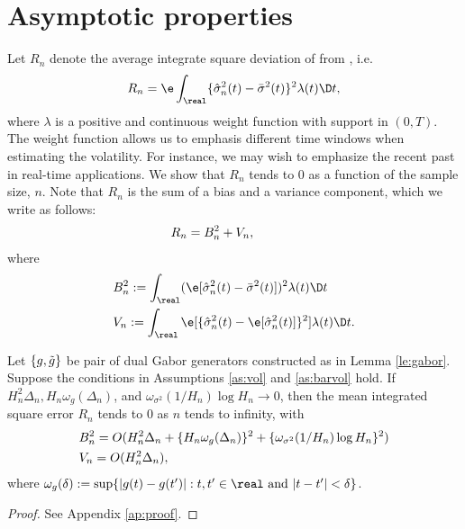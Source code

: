 \section{Asymptotic properties} \label{sec:deviation}
Let $R_n$ denote the average integrate square deviation of \svn from \bsv, i.e.  
\begin{align}
R_n = \e \int_\real \{\svn(t) - \bsv(t)\}^2 \lambda(t) \D t,
  \label{eq:remeainder}
\end{align}
where $\lambda$ is a positive and continuous weight function with support in $(0,T)$. The weight function allows us to emphasis different time windows when estimating the volatility. For instance, we may wish to emphasize the recent past in real-time applications. 
We show that $R_n$ tends to 0 as a function of the sample size, $n$. Note that $R_n$ is the sum of a bias and a variance component, which we write as follows:
\begin{align}
  &R_n = B_n^2 + V_n, \notag \qquad \text{ } 
\end{align}
where
\begin{align}
  &B^2_n := \int_\real (\e[\svn(t) - \bsv(t)])^2 \lambda(t) \D t \notag \\
&V_n :=  \int_\real \e[\{\svn(t) - \e[\svn(t)]\}^2] \lambda(t) \D t. \notag
  \label{}
\end{align}
\begin{prop} \label{pr:consistency}
  Let $\{g, \tilde{g}\}$ be pair of dual Gabor generators constructed as in Lemma \eqref{le:gabor}.   Suppose the conditions in  Assumptions \eqref{as:vol} and \eqref{as:barvol} hold. If  $H_n^2 \Delta_n, H_n\omega_g(\Delta_n)$, and  $\omega_{\sigma^2}(1/H_n) \log H_n\to 0$, then the mean integrated square error
  $R_n$ tends to 0 as $n$ tends to infinity, with 
  \begin{align}
    & B_n^2 = O(H_n^2\Delta_n + \{H_n\omega_g(\Delta_n)\}^2 + \{\omega_{\sigma^2}(1/H_n) \log H_n\}^2)\notag \\
    & V_n = O(H_n^2 \Delta_n),
    \label{}
  \end{align}
  where $\omega_g(\delta) := \sup \{ |g (t) - g(t')|: t, t' \in \real \text{ and } |t -t'| < \delta\}$. 
\end{prop}
\begin{proof}
  See Appendix \ref{ap:proof}.
\end{proof}
